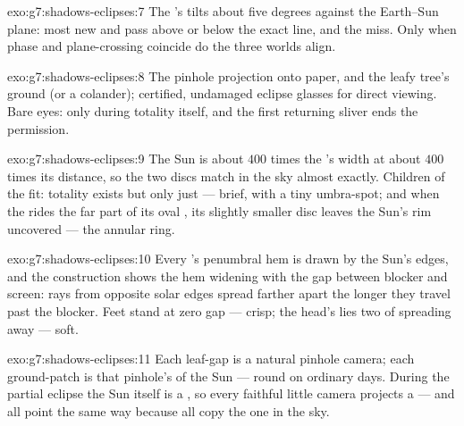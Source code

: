 \begin{solution}{exo:g7:shadows-eclipses:7}
The 's  tilts about five degrees against the Earth--Sun
plane: most new and  pass above or below the exact
line, and the  miss. Only when phase and plane-crossing
coincide do the three worlds align.
\end{solution}

\begin{solution}{exo:g7:shadows-eclipses:8}
The pinhole projection onto paper, and the leafy tree's ground
 (or a colander); certified, undamaged eclipse glasses
for direct viewing. Bare eyes: only during totality itself, and
the first returning sliver ends the permission.
\end{solution}

\begin{solution}{exo:g7:shadows-eclipses:9}
The Sun is about $400$ times the 's width at about $400$
times its distance, so the two discs match in the sky almost
exactly. Children of the fit: totality exists but only just ---
brief, with a tiny umbra-spot; and when the  rides the far
part of its oval , its slightly smaller disc leaves the
Sun's rim uncovered --- the annular ring.
\end{solution}

\begin{solution}{exo:g7:shadows-eclipses:10}
Every 's penumbral hem is drawn by the Sun's edges, and the
construction shows the hem widening with the gap between blocker
and screen: rays from opposite solar edges spread farther apart
the longer they travel past the blocker. Feet stand at zero gap
--- crisp; the head's  lies two  of spreading away
--- soft.
\end{solution}

\begin{solution}{exo:g7:shadows-eclipses:11}
Each leaf-gap is a natural pinhole camera; each ground-patch is
that pinhole's  of the Sun --- round on ordinary days.
During the partial eclipse the Sun itself is a , so every
faithful little camera projects a  --- and all point the
same way because all copy the one  in the sky.
\end{solution}

